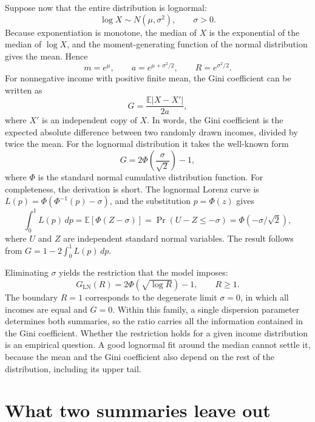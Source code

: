 \documentclass[11pt,a4paper]{article}
\begin{document}
Suppose now that the entire distribution is lognormal:
\begin{equation}
\log X\sim N(\mu,\sigma^2),\qquad \sigma>0.
\end{equation}
Because exponentiation is monotone, the median of $X$ is the exponential of the median of $\log X$, and the moment-generating function of the normal distribution gives the mean. Hence
\begin{equation}
m=e^\mu,\qquad a=e^{\mu+\sigma^2/2},\qquad R=e^{\sigma^2/2}.
\end{equation}
For nonnegative income with positive finite mean, the Gini coefficient can be written as
\begin{equation}
G=\frac{\mathbb{E}|X-X'|}{2a},
\end{equation}
where $X'$ is an independent copy of $X$. In words, the Gini coefficient is the expected absolute difference between two randomly drawn incomes, divided by twice the mean. For the lognormal distribution it takes the well-known form \cite{aitchison}
\begin{equation}
G=2\Phi\!\left(\frac{\sigma}{\sqrt{2}}\right)-1,
\end{equation}
where $\Phi$ is the standard normal cumulative distribution function. For completeness, the derivation is short. The lognormal Lorenz curve is $L(p)=\Phi(\Phi^{-1}(p)-\sigma)$, and the substitution $p=\Phi(z)$ gives
\[
\int_0^1L(p)\,dp=\mathbb{E}[\Phi(Z-\sigma)]
=\Pr(U-Z\leq-\sigma)=\Phi(-\sigma/\sqrt{2}),
\]
where $U$ and $Z$ are independent standard normal variables. The result follows from $G=1-2\int_0^1L(p)\,dp$.

Eliminating $\sigma$ yields the restriction that the model imposes:
\begin{equation}
\boxed{G_{\mathrm{LN}}(R)=2\Phi\!\left(\sqrt{\log R}\right)-1,
\qquad R\geq1.}
\label{eq:lognormal}
\end{equation}
The boundary $R=1$ corresponds to the degenerate limit $\sigma=0$, in which all incomes are equal and $G=0$. Within this family, a single dispersion parameter determines both summaries, so the ratio carries all the information contained in the Gini coefficient. Whether the restriction holds for a given income distribution is an empirical question. A good lognormal fit around the median cannot settle it, because the mean and the Gini coefficient also depend on the rest of the distribution, including its upper tail.


\section{What two summaries leave out}
\label{sec:counter}
\end{document}
